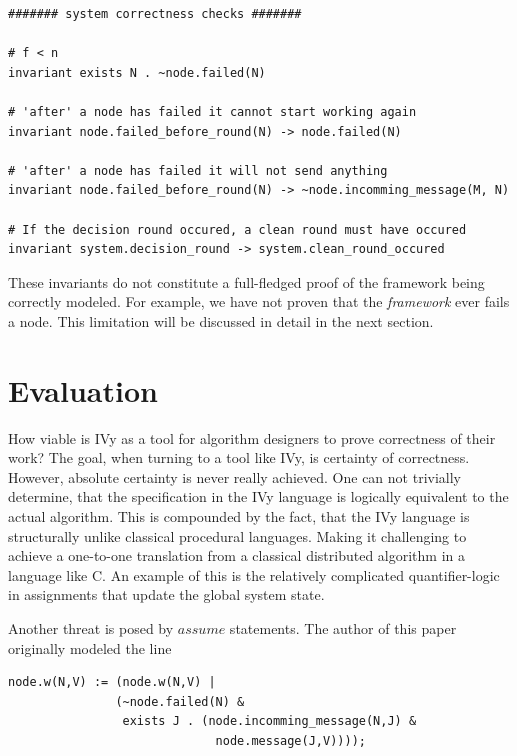 \documentclass[fleqn]{article}
\begin{document}
\begin{mdframed}[nobreak=true, backgroundcolor=light-gray, roundcorner=10pt,leftmargin=1, rightmargin=1, innerleftmargin=15, innertopmargin=15,innerbottommargin=15, outerlinewidth=1, linecolor=light-gray]
\begin{lstlisting}
####### system correctness checks #######

# f < n
invariant exists N . ~node.failed(N)

# 'after' a node has failed it cannot start working again
invariant node.failed_before_round(N) -> node.failed(N)

# 'after' a node has failed it will not send anything
invariant node.failed_before_round(N) -> ~node.incomming_message(M, N)

# If the decision round occured, a clean round must have occured
invariant system.decision_round -> system.clean_round_occured

\end{lstlisting}
\end{mdframed}

These invariants do not constitute a full-fledged proof of the framework being correctly modeled. For example, we have not proven that the \textit{framework} ever fails a node. This limitation will be discussed in detail in the next section.

\section{Evaluation}


How viable is IVy as a tool for algorithm designers to prove correctness
of their work?  The goal, when turning to a tool like IVy, is certainty of
correctness. However, absolute certainty is never really achieved.
One can not trivially determine, that the specification in the IVy language is logically equivalent to the actual algorithm.
This is compounded by the fact, that the IVy language is structurally unlike classical procedural languages. Making it challenging to achieve
a one-to-one translation from a classical distributed algorithm in a language like C. An example of this is
the relatively complicated quantifier-logic in assignments that update the global system state.

Another threat is posed by $assume$ statements. The author of this paper originally modeled the line

\begin{mdframed}[nobreak=true, backgroundcolor=light-gray, roundcorner=10pt,leftmargin=1, rightmargin=1, innerleftmargin=15, innertopmargin=15,innerbottommargin=15, outerlinewidth=1, linecolor=light-gray]
\begin{lstlisting}
node.w(N,V) := (node.w(N,V) |
               (~node.failed(N) &
                exists J . (node.incomming_message(N,J) &
                             node.message(J,V))));
\end{lstlisting}
\end{mdframed}
\end{document}
